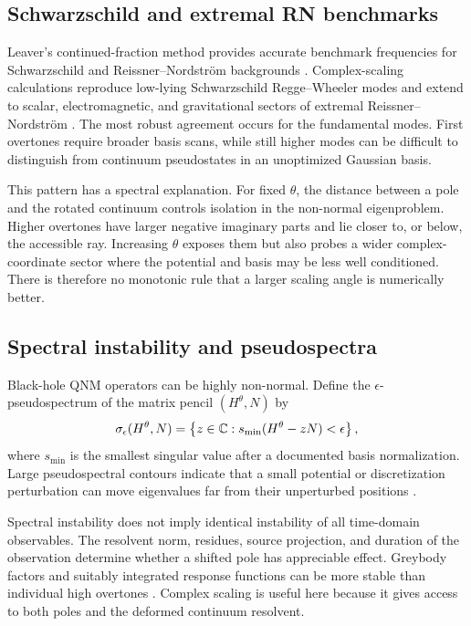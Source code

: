 \subsection{Schwarzschild and extremal RN benchmarks}
\label{subsec:bh-csm-benchmarks}

Leaver's continued-fraction method provides accurate benchmark frequencies
for Schwarzschild and Reissner--Nordstr\"om backgrounds
\cite{Leaver:1985ax,Leaver:1986gd,Nollert:1993zz}.  Complex-scaling
calculations reproduce low-lying Schwarzschild Regge--Wheeler modes and extend
to scalar, electromagnetic, and gravitational sectors of extremal
Reissner--Nordstr\"om
\cite{Ogawa:2026veu}.  The most robust agreement occurs for the fundamental
modes.  First overtones require broader basis scans, while still higher modes
can be difficult to distinguish from continuum pseudostates in an unoptimized
Gaussian basis.

This pattern has a spectral explanation.  For fixed $\theta$, the distance
between a pole and the rotated continuum controls isolation in the non-normal
eigenproblem.  Higher overtones have larger negative imaginary parts and lie
closer to, or below, the accessible ray.  Increasing $\theta$ exposes them but
also probes a wider complex-coordinate sector where the potential and basis
may be less well conditioned.  There is therefore no monotonic rule that a
larger scaling angle is numerically better.

\subsection{Spectral instability and pseudospectra}
\label{subsec:bh-pseudospectrum}

Black-hole QNM operators can be highly non-normal.  Define the
$\epsilon$-pseudospectrum of the matrix pencil $(H^\theta,N)$ by
\begin{equation}
  \sigma_\epsilon(H^\theta,N)
  =\left\{z\in\mathbb{C}:
  s_{\min}(H^\theta-zN)<\epsilon\right\},
  \label{eq:generalized-pseudospectrum}
\end{equation}
where $s_{\min}$ is the smallest singular value after a documented basis
normalization.  Large pseudospectral contours indicate that a small potential
or discretization perturbation can move eigenvalues far from their unperturbed
positions
\cite{Jaramillo:2020tuu,Yang:2024vor}.

Spectral instability does not imply identical instability of all time-domain
observables.  The resolvent norm, residues, source projection, and duration of
the observation determine whether a shifted pole has appreciable effect.
Greybody factors and suitably integrated response functions can be more
stable than individual high overtones
\cite{Rosato:2024arw}.  Complex scaling is useful here because it gives access
to both poles and the deformed continuum resolvent.
